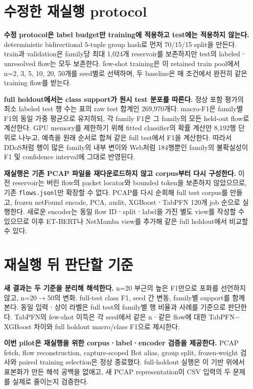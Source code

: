 \section{수정한 재실행 protocol}
\textbf{수정 protocol은 label budget만 training에 적용하고 test에는 적용하지 않는다.} deterministic bidirectional 5-tuple group hash로 먼저 70/15/15 split을 만든다. train과 validation은 family당 최대 1,024개 reservoir를 보존하지만 test의 labeledㆍunresolved flow는 모두 보존한다. few-shot training은 이 retained train pool에서 n=2, 3, 5, 10, 20, 50개를 seed별로 선택하며, 두 baseline은 매 조건에서 완전히 같은 training flow를 받는다.

\textbf{full holdout에서는 class support가 원시 test 분포를 따른다.} 정상 포함 평가의 최소 labeled test 행 수는 표의 raw test 합계인 269,970개다. macro-F1은 family별 F1의 동일 가중 평균으로 유지하되, 각 family F1은 그 family의 모든 held-out flow로 계산한다. GPU memory를 제한하기 위해 fitted classifier의 확률 계산만 8,192행 단위로 나누고, 예측을 원래 순서로 합쳐 같은 full test에서 F1을 계산한다. 따라서 DDoS처럼 행이 많은 family의 내부 변이와 Web처럼 184행뿐인 family의 불확실성이 F1 및 confidence interval에 그대로 반영된다.

\textbf{재실행은 기존 PCAP 파일을 재다운로드하지 않고 corpus부터 다시 구성한다.} 이전 reservoir는 버린 flow의 packet locator와 bounded token을 보존하지 않았으므로, 기존 \texttt{flows.jsonl}만 확장할 수 없다. PCAP를 다시 순회해 full test corpus를 만들고, frozen netFound encode, PCA, audit, XGBoostㆍTabPFN 120개 job 순으로 실행한다. 새로운 encoder는 동일 flow IDㆍsplitㆍlabel을 가진 별도 view를 작성할 수 있으므로 이후 ET-BERT나 NetMamba view를 추가해 같은 full holdout에서 비교할 수 있다.

\section{재실행 뒤 판단할 기준}
\textbf{새 결과는 두 기준을 분리해 해석한다.} n=20 부근의 높은 F1만으로 포화를 선언하지 않고, n=20$\rightarrow$50의 변화, full-test class F1, seed 간 변동, family별 support를 함께 본다. 동일 입력ㆍ상이 라벨은 full test의 family별 행 비율과 사례를 기준으로 판단한다. TabPFN의 few-shot 이득은 각 seed에서 같은 nㆍ같은 flow에 대한 TabPFN$-$XGBoost 차이와 full holdout macro/class F1으로 제시한다.

\textbf{이번 pilot은 재실행을 위한 corpusㆍlabelㆍencoder 검증을 제공한다.} PCAP fetch, flow reconstruction, capture-scoped Bot alias, group split, frozen-weight 검사와 paired training selection은 정상 종료했다. full-holdout 실행은 이 기반 위에서 표본화가 만든 해석 공백을 없애고, 새 PCAP representation이 CSV 입력의 두 문제를 실제로 줄이는지 검증한다.


